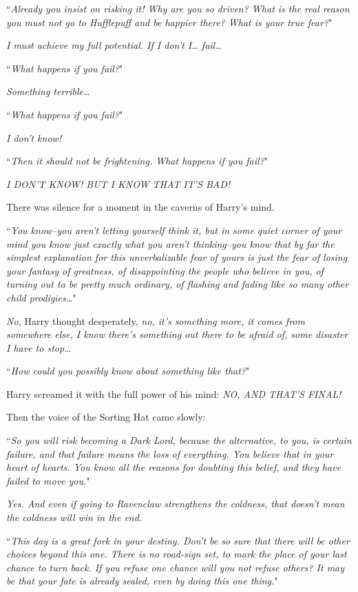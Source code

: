 ``\emph{Already you insist on risking it! Why are you so driven? What is the real reason you must not go to Hufflepuff and \emph{be happier} there? What is your true fear?}"

\emph{I must achieve my full potential. If I don't I{\ldots} fail{\ldots}}

``\emph{What happens if you fail?}"

\emph{Something terrible{\ldots}}

``\emph{What happens if you fail?}"

\emph{I don't know!}

``\emph{Then it should not be frightening. What happens if you fail?}"

\emph{I DON'T KNOW! BUT I KNOW THAT IT'S BAD!}

There was silence for a moment in the caverns of Harry's mind.

``\emph{You know\---you aren't letting yourself think it, but in some quiet corner of your mind you know just exactly \emph{what} you aren't thinking\---you \emph{know} that by far the simplest explanation for this unverbalizable fear of yours is just the fear of losing your fantasy of greatness, of disappointing the people who believe in you, of turning out to be pretty much ordinary, of flashing and fading like so many other child prodigies{\ldots}}"

\emph{No,} Harry thought desperately, \emph{no, it's something more, it comes from somewhere else, I know there's something out there to be afraid of, some disaster I have to stop{\ldots}}

``\emph{How could you possibly know about something like that?}"

Harry screamed it with the full power of his mind: \emph{NO, AND THAT'S FINAL!}

Then the voice of the Sorting Hat came slowly:

``\emph{So you will risk becoming a Dark Lord, because the alternative, to you, is certain failure, and that failure means the loss of everything. You believe that in your heart of hearts. You know all the reasons for doubting this belief, and they have failed to move you.}"

\emph{Yes. And even if going to Ravenclaw \emph{strengthens} the coldness, that doesn't mean the coldness will \emph{win} in the end.}

``\emph{This day is a great fork in your destiny. Don't be so sure that there will be other choices beyond this one. There is no road-sign set, to mark the place of your \emph{last} chance to turn back. If you refuse one chance will you not refuse others? It may be that your fate is already sealed, even by doing this one thing.}"

